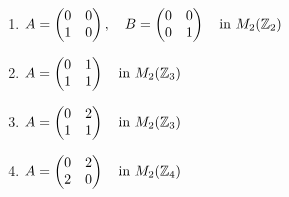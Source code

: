 \begin{enumerate}
    \item[\#7)] $ A = \begin{pmatrix} 0 & 0 \\ 1 & 0 \end{pmatrix}, \quad 
                  B = \begin{pmatrix} 0 & 0 \\ 0 & 1 \end{pmatrix} 
                  \quad \text{in } M_2({\mathbb{Z}}_2) $
    
    \item[\#8)] $ A = \begin{pmatrix} 0 & 1 \\ 1 & 1 \end{pmatrix} 
                  \quad \text{in } M_2({\mathbb{Z}}_3) $
    
    \item[\#9)] $ A = \begin{pmatrix} 0 & 2 \\ 1 & 1 \end{pmatrix} 
                  \quad \text{in } M_2({\mathbb{Z}}_3) $
    
    \item[\#10)] $ A = \begin{pmatrix} 0 & 2 \\ 2 & 0 \end{pmatrix} 
                   \quad \text{in } M_2({\mathbb{Z}}_4) $
    

\end{enumerate}
